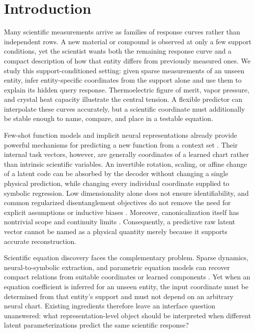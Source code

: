 \section{Introduction}
\label{sec:introduction}

Many scientific measurements arrive as families of response curves rather than
independent rows.  A new material or compound is observed at only a few support
conditions, yet the scientist wants both the remaining response curve and a
compact description of how that entity differs from previously measured ones.
We study this support-conditioned setting: given sparse measurements of an
unseen entity, infer entity-specific coordinates from the support alone and use
them to explain its hidden query response.  Thermoelectric figure of merit,
vapor pressure, and crystal heat capacity illustrate the central tension.  A
flexible predictor can interpolate these curves accurately, but a scientific
coordinate must additionally be stable enough to name, compare, and place in a
testable equation.

Few-shot function models and implicit neural representations already provide
powerful mechanisms for predicting a new function from a context set
\citep{garnelo2018conditional,xu2020metafun,gondal2021function,dupont2022functa}.
Their internal task vectors, however, are generally coordinates of a learned
chart rather than intrinsic scientific variables.  An invertible rotation,
scaling, or affine change of a latent code can be absorbed by the decoder
without changing a single physical prediction, while changing every individual
coordinate supplied to symbolic regression.  Low dimensionality alone does not
ensure identifiability, and common regularized disentanglement objectives do not
remove the need for explicit assumptions or inductive biases
\citep{locatello2019challenging,khemakhem2020variational}.  Moreover,
canonicalization itself has nontrivial scope and continuity limits
\citep{ma2024canonicalization,dym2024equivariant}.  Consequently, a predictive
raw latent vector cannot be named as a physical quantity merely because it
supports accurate reconstruction.

Scientific equation discovery faces the complementary problem.  Sparse
dynamics, neural-to-symbolic extraction, and parametric equation models can
recover compact relations from suitable coordinates or learned components
\citep{champion2019data,cranmer2020discovering,zhang2022parametric,podina2023universal}.
Yet when an equation coefficient is inferred for an unseen entity, the input
coordinate must be determined from that entity's support and must not depend on
an arbitrary neural chart.  Existing ingredients therefore leave an interface
question unanswered: what representation-level object should be interpreted
when different latent parameterizations predict the same scientific response?

